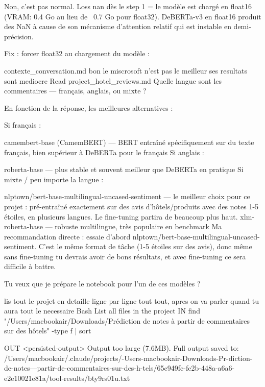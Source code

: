 Non, c'est pas normal. Loss nan dès le step 1 = le modèle est chargé en float16 (VRAM: 0.4 Go au lieu de ~0.7 Go pour float32). DeBERTa-v3 en float16 produit des NaN à cause de son mécanisme d'attention relatif qui est instable en demi-précision.

Fix : forcer float32 au chargement du modèle :

contexte_conversation.md
bon le miscrosoft n'est pas le meilleur ses resultats sont mediocre
Read project_hotel_reviews.md
Quelle langue sont les commentaires — français, anglais, ou mixte ?

En fonction de la réponse, les meilleures alternatives :

Si français :

camembert-base (CamemBERT) — BERT entraîné spécifiquement sur du texte français, bien supérieur à DeBERTa pour le français
Si anglais :

roberta-base — plus stable et souvent meilleur que DeBERTa en pratique
Si mixte / peu importe la langue :

nlptown/bert-base-multilingual-uncased-sentiment — le meilleur choix pour ce projet : pré-entraîné exactement sur des avis d'hôtels/produits avec des notes 1-5 étoiles, en plusieurs langues. Le fine-tuning partira de beaucoup plus haut.
xlm-roberta-base — robuste multilingue, très populaire en benchmark
Ma recommandation directe : essaie d'abord nlptown/bert-base-multilingual-uncased-sentiment. C'est le même format de tâche (1-5 étoiles sur des avis), donc même sans fine-tuning tu devrais avoir de bons résultats, et avec fine-tuning ce sera difficile à battre.

Tu veux que je prépare le notebook pour l'un de ces modèles ?

lis tout le projet en detaille ligne par ligne tout tout, apres on va parler quand tu aura tout le necessaire
Bash List all files in the project
IN
find "/Users/macbookair/Downloads/Prédiction de notes à partir de commentaires sur des hôtels" -type f | sort

OUT
<persisted-output>
Output too large (7.6MB). Full output saved to: /Users/macbookair/.claude/projects/-Users-macbookair-Downloads-Pr-diction-de-notes---partir-de-commentaires-sur-des-h-tels/65c949fc-fc2b-448a-a6a6-e2e10021e81a/tool-results/bty9rs01u.txt

